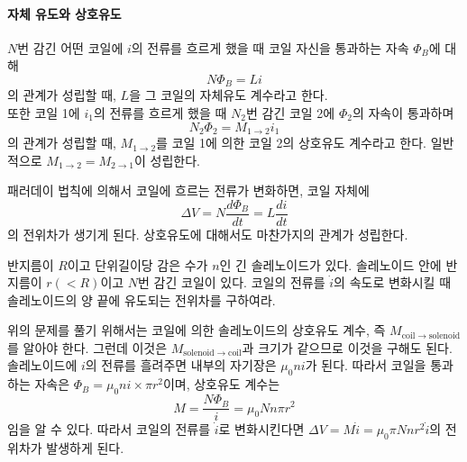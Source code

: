 \paragraph{자체 유도와 상호유도}
\begin{remark}
$N$번 감긴 어떤 코일에 $i$의 전류를 흐르게 했을 때 코일 자신을 통과하는 자속 $\Phi_B$에 대해
\begin{equation}
N\Phi_B = Li
\end{equation}
의 관계가 성립할 때, $L$을 그 코일의 자체유도 계수라고 한다.\\
또한 코일 1에 $i_1$의 전류를 흐르게 했을 때 $N_2$번 감긴 코일 2에 $\Phi_2$의 자속이 통과하며
\begin{equation}
N_2 \Phi_2 = M_{1\to2}i_1
\end{equation}
의 관계가 성립할 때, $M_{1\to2}$를 코일 1에 의한 코일 2의 상호유도 계수라고 한다. 일반적으로 $M_{1\to2}=M_{2\to1}$이 성립한다.
\end{remark}
패러데이 법칙에 의해서 코일에 흐르는 전류가 변화하면, 코일 자체에 
\begin{equation}
\Delta V = N\frac{d\Phi_B}{dt}=L\frac{di}{dt}
\end{equation}
의 전위차가 생기게 된다. 상호유도에 대해서도 마찬가지의 관계가 성립한다.
\begin{example}
반지름이 $R$이고 단위길이당 감은 수가 $n$인 긴 솔레노이드가 있다. 솔레노이드 안에 반지름이 $r(<R)$이고 $N$번 감긴 코일이 있다. 코일의 전류를 $\dot{i}$의 속도로 변화시킬 때 솔레노이드의 양 끝에 유도되는 전위차를 구하여라.
\end{example}
위의 문제를 풀기 위해서는 코일에 의한 솔레노이드의 상호유도 계수, 즉 $M_{\mathrm{coil\to solenoid}}$를 알아야 한다. 그런데 이것은 $M_{\mathrm{solenoid\to coil}}$과 크기가 같으므로 이것을 구해도 된다. 솔레노이드에 $i$의 전류를 흘려주면 내부의 자기장은 $\mu_0 n i$가 된다. 따라서 코일을 통과하는 자속은 $\Phi_B = \mu_0 n i \times \pi r^2$이며, 상호유도 계수는
\begin{equation}
M=\frac{N\Phi_B}{i}=\mu_0 Nn\pi r^2
\end{equation}
임을 알 수 있다. 따라서 코일의 전류를 $\dot{i}$로 변화시킨다면 $\Delta V = M\dot{i}=\mu_0\pi Nnr^2 \dot{i}$의 전위차가 발생하게 된다.\\
